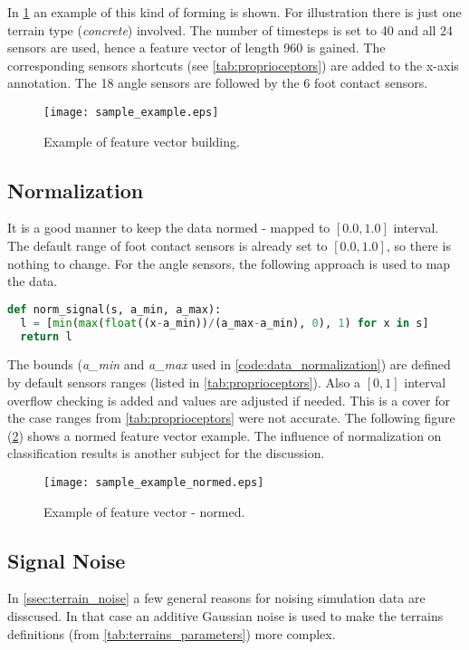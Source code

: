 In \cref{fig:sample_example} an example of this kind of forming is shown. For illustration there is just one terrain type (\textit{concrete}) involved. The number of timesteps is set to 40 and all 24 sensors are used, hence a feature vector of length 960 is gained. The corresponding sensors shortcuts (see \cref{tab:proprioceptors}) are added to the x-axis annotation. The 18 angle sensors are followed by the 6 foot contact sensors.

\begin{figure}[H]
  \centering
  \texttt{[image: sample\_example.eps]}
  \caption{Example of feature vector building.}
  \label{fig:sample_example}
\end{figure}

\subsection{Normalization} \label{ssec:normalization}
It is a good manner to keep the data normed - mapped to $ [0.0, 1.0] $ interval. The default range of foot contact sensors is already set to $ [0.0, 1.0] $, so there is nothing to change. For the angle sensors, the following approach is used to map the data. 

\begin{lstlisting}[language=Python, caption={Data normalization}, label=code:data_normalization]
def norm_signal(s, a_min, a_max):
  l = [min(max(float((x-a_min))/(a_max-a_min), 0), 1) for x in s]   
  return l
\end{lstlisting}

The bounds (\textit{a\_min} and \textit{a\_max} used in \cref{code:data_normalization}) are defined by default sensors ranges (listed in \cref{tab:proprioceptors}). Also a $ [0, 1] $ interval overflow checking is added and values are adjusted if needed. This is a cover for the case ranges from \cref{tab:proprioceptors} were not accurate. The following figure (\ref{fig:sample_example_normed}) shows a normed feature vector example. The influence of normalization on classification results is another subject for the discussion.

\begin{figure}[H]
  \centering
  \texttt{[image: sample\_example\_normed.eps]}
  \caption{Example of feature vector - normed.}
  \label{fig:sample_example_normed}
\end{figure}

\subsection{Signal Noise} \label{ssec:signal_noise}
In \cref{ssec:terrain_noise} a few general reasons for noising simulation data are disscused. In that case an additive Gaussian noise is used to make the terrains definitions (from \cref{tab:terrains_parameters}) more complex.

